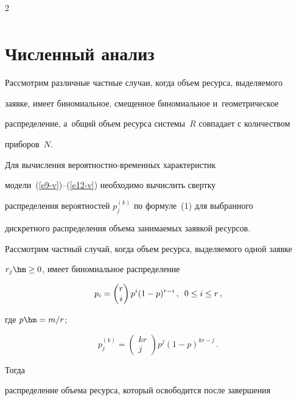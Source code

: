 \begin{multicols}{2}
\begin{multline}
  \label{e12-v}

  \end{multline}



\section{Численный анализ}

    

  Рассмотрим различные частные случаи, когда объем ресурса, выделяемого 

заявке, имеет биномиальное, смещенное биномиальное и~геометрическое 

распределение, а~общий объем ресурса сис\-те\-мы~$R$ совпадает с количеством 

приборов~$N$.

   

  Для вычисления вероят\-ност\-но-вре\-мен\-н$\acute{\mbox{ы}}$х характеристик  

модели~(\ref{e9-v})--(\ref{e12-v}) необходимо вы\-чис\-лить свертку 

распределения вероятностей $p_j^{(k)}$ по формуле~(1) для выбранного 

дискретного распределения объема занимаемых заявкой ресурсов.

  

  Рассмотрим частный случай, когда объем ресурса, выделяемого одной заявке 

$r_j\hm\geq 0$, имеет биномиальное распределение 

$$

p_i= \begin{pmatrix}

r\\ 

i\end{pmatrix} p^i(1-p)^{r-i}\,,\enskip 

0\leq i\leq r\,,

$$

 где $p\hm= m/r$;

$$

p_j^{(k)} = \begin{pmatrix} 

kr\\ j\end{pmatrix} p^j (1- p)^{kr-j}\,.

$$ 



Тогда 

распределение объема ресурса, который освободится после завершения 


\end{multicols}
